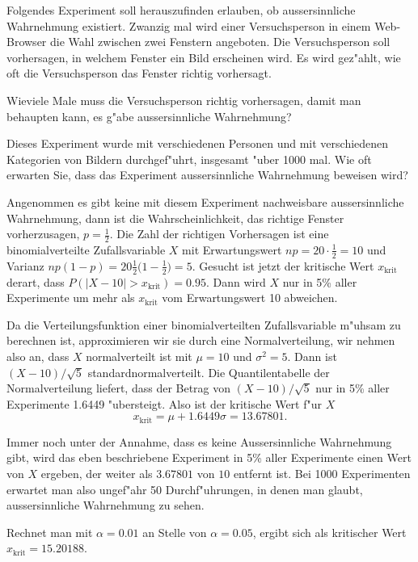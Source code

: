 Folgendes Experiment soll herauszufinden erlauben, ob aussersinnliche
Wahrnehmung existiert.
Zwanzig mal wird einer Versuchsperson in einem Web-Browser die Wahl zwischen
zwei Fenstern angeboten. Die Versuchsperson soll vorhersagen,
in welchem Fenster ein Bild erscheinen wird. Es wird gez"ahlt,
wie oft die Versuchsperson das Fenster richtig vorhersagt.
\begin{teilaufgaben}
\item Wieviele Male muss die Versuchsperson richtig vorhersagen,
damit man behaupten kann, es g"abe aussersinnliche Wahrnehmung?
\item Dieses Experiment wurde mit verschiedenen Personen
und mit verschiedenen Kategorien von Bildern durchgef"uhrt,
insgesamt "uber 1000 mal. Wie oft erwarten Sie, dass das
Experiment aussersinnliche Wahrnehmung beweisen wird?
\end{teilaufgaben}

\begin{loesung}
\begin{teilaufgaben}
\item Angenommen es gibt keine mit diesem Experiment nachweisbare
aussersinnliche Wahrnehmung, dann ist die Wahrscheinlichkeit, das
richtige Fenster vorherzusagen, $p=\frac12$. Die Zahl der richtigen
Vorhersagen ist eine binomialverteilte Zufallsvariable $X$ mit
Erwartungswert $np=20\cdot\frac12=10$ und Varianz
$np(1-p)=20\frac12\bigl(1-\frac12\bigr)=5$. Gesucht ist jetzt
der kritische Wert $x_{\text{krit}}$ derart, dass
$P(|X-10| > x_{\text{krit}})=0.95$. Dann wird $X$ nur in 5\% aller
Experimente um mehr als $x_{\text{krit}}$ vom Erwartungswert 10 abweichen.

Da die Verteilungsfunktion einer binomialverteilten Zufallsvariable
m"uhsam zu berechnen ist, approximieren wir sie durch eine Normalverteilung,
wir nehmen also an, dass $X$ normalverteilt ist mit $\mu = 10$
und $\sigma^2=5$. Dann ist $(X-10)/\sqrt{5}$ standardnormalverteilt.
Die Quantilentabelle der Normalverteilung liefert, dass der Betrag
von $(X-10)/\sqrt{5}$
nur in 5\% aller Experimente 1.6449 "ubersteigt. Also ist der kritische
Wert f"ur $X$
\[
x_{\text{krit}} =  \mu + 1.6449 \sigma =  13.67801.
\]
\item
Immer noch unter der Annahme, dass es keine Aussersinnliche Wahrnehmung
gibt, wird das eben beschriebene Experiment in 5\% aller Experimente
einen Wert von $X$ ergeben, der weiter als $3.67801$ von $10$ entfernt
ist. Bei 1000 Experimenten erwartet man also ungef"ahr 50 Durchf"uhrungen,
in denen man glaubt, aussersinnliche Wahrnehmung zu sehen.
\end{teilaufgaben}
Rechnet man mit $\alpha = 0.01$ an Stelle von $\alpha = 0.05$,
ergibt sich als kritischer Wert $x_{\text{krit}}=15.20188$.
\end{loesung}

